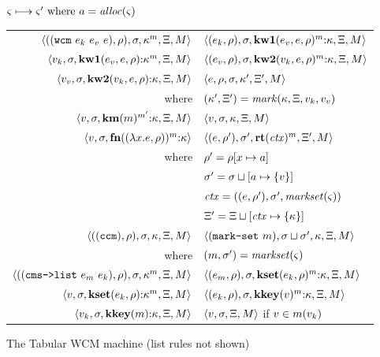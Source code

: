 {%
\begin{figure}
  \centering
  $\varsigma \longmapsto \varsigma' \text{ where } a = \mathit{alloc}(\varsigma)$ \\
  \begin{tabular}{r|l}
    \hline
    $\langle ((\texttt{wcm}\ e_k\ e_v\ e), \rho), \sigma, \kappa^m, \Xi, M \rangle$
    &
    $\langle (e_k, \rho), \sigma, \mathbf{kw1}(e_v,e,\rho)^m{\tt :} \kappa, \Xi, M \rangle$
    \\
    $\langle v_k, \sigma, \mathbf{kw1}(e_v,e,\rho){\tt :} \kappa^m, \Xi, M \rangle$
    &
    $\langle (e_v, \rho), \sigma, \mathbf{kw2}(v_k,e,\rho)^m{\tt :} \kappa, \Xi, M \rangle$
    \\    
    $\langle v_v, \sigma, \mathbf{kw2}(v_k, e, \rho){\tt :} \kappa, \Xi, M \rangle$
    &
    $\langle e,\rho,\sigma,\kappa',\Xi', M \rangle$ \\
    where & $(\kappa',\Xi') = \mathit{mark}(\kappa,\Xi,v_k,v_v)$
    \\
   $\langle v,\sigma,\mathbf{km}(m)^{m'}{\tt :} \kappa, \Xi, M \rangle$
   &
   $\langle v,\sigma,\kappa,\Xi,M \rangle$
   \\
    $\langle v,\sigma,\mathbf{fn}{}((\lambda{} x. e, \rho))^m{\tt :} \kappa \rangle$
    &
    $\langle (e, \rho'), \sigma', \mathbf{rt}(\mathit{ctx})^m,\Xi',M \rangle$
    \\ where & $\rho' = \rho[x \mapsto a]$ \\
    & $\sigma' = \sigma\sqcup[a \mapsto \{ v \}]$ \\
    & $\mathit{ctx} = ((e,\rho'),\sigma', \mathit{markset}(\varsigma))$ \\
    & $\Xi' = \Xi\sqcup[\mathit{ctx} \mapsto \{ \kappa \}]$
    \\
    $\langle ((\texttt{ccm}),\rho),\sigma,\kappa,\Xi,M \rangle$
    &
    $\langle (\texttt{mark-set}\ m),\sigma\sqcup\sigma',\kappa,\Xi,M \rangle$
    \\ where & $(m,\sigma') = \mathit{markset}(\varsigma)$
    \\
    $\langle ((\texttt{cms->list}\ e_m\ e_k), \rho), \sigma, \kappa^m, \Xi, M \rangle$
    &
    $\langle (e_m, \rho), \sigma, \mathbf{kset}(e_k,\rho)^m{\tt :} \kappa, \Xi, M \rangle$
    \\
    $\langle v, \sigma, \mathbf{kset}(e_k,\rho){\tt :} \kappa^m, \Xi, M \rangle$
    &
    $\langle (e_k, \rho), \sigma, \mathbf{kkey}(v)^m{\tt :} \kappa, \Xi, M \rangle$
    \\
    $\langle v_k, \sigma, \mathbf{kkey}(m){\tt :} \kappa, \Xi, M \rangle$
    &
    $\langle v, \sigma, \Xi, M \rangle$ if $v \in m(v_k)$
  \end{tabular}  
  \caption{The Tabular WCM machine (list rules not shown)}
  \label{fig:wcm}
\end{figure}

}
